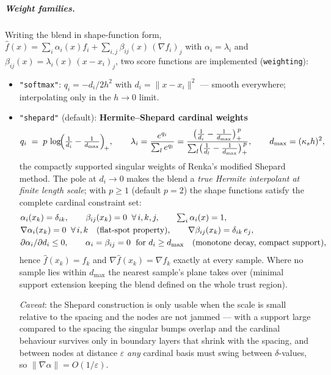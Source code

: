 \documentclass[11pt,a4paper]{article}
\newcommand{\code}[1]{\texttt{#1}}
\begin{document}
\subparagraph{Weight families.} Writing the blend in shape-function form,
$\hat f(x) = \sum_i \alpha_i(x) f_i + \sum_{i,j} \beta_{ij}(x)\, (\nabla f_i)_j$
with $\alpha_i = \lambda_i$ and $\beta_{ij}(x) = \lambda_i(x)\,(x-x_i)_j$,
two score functions are implemented (\code{weighting}):
\begin{itemize}
\item \code{"softmax"}: $q_i = -d_i/2h^2$ with $d_i = \lVert x-x_i\rVert^2$
--- smooth everywhere; interpolating only in the $h \to 0$ limit.
\item \code{"shepard"} (default): \textbf{Hermite--Shepard cardinal
weights}
\begin{equation}
q_i \;=\; p\,\log\!\Bigl(\tfrac{1}{d_i} - \tfrac{1}{d_{\max}}\Bigr)_{\!+},
\qquad
\lambda_i = \frac{e^{q_i}}{\sum_l e^{q_l}}
= \frac{\bigl(\tfrac{1}{d_i}-\tfrac{1}{d_{\max}}\bigr)_+^{\,p}}
{\sum_l \bigl(\tfrac{1}{d_l}-\tfrac{1}{d_{\max}}\bigr)_+^{\,p}},
\qquad d_{\max} = (\kappa_s h)^2,
\label{eq:shepard}
\end{equation}
the compactly supported singular weights of Renka's modified Shepard
method. The pole at $d_i \to 0$ makes the blend a \emph{true Hermite
interpolant at finite length scale}; with $p \ge 1$ (default $p=2$) the
shape functions satisfy the complete cardinal constraint set:
\begin{align}
&\alpha_i(x_k) = \delta_{ik}, \qquad
\beta_{ij}(x_k) = 0 \;\;\forall\, i,k,j, \qquad
\textstyle\sum_i \alpha_i(x) = 1, \notag\\
&\nabla\alpha_i(x_k) = 0 \;\;\forall\, i,k
\quad\text{(flat-spot property)}, \qquad
\nabla\beta_{ij}(x_k) = \delta_{ik}\, e_j, \notag\\
&\partial \alpha_i / \partial d_i \le 0, \qquad
\alpha_i = \beta_{ij} = 0 \;\text{ for } d_i \ge d_{\max}
\quad\text{(monotone decay, compact support)}, \notag
\end{align}
hence $\hat f(x_k) = f_k$ and $\nabla \hat f(x_k) = \nabla f_k$ exactly at
every sample. Where no sample lies within $d_{\max}$ the nearest sample's
plane takes over (minimal support extension keeping the blend defined on
the whole trust region).

\emph{Caveat}: the Shepard construction is only usable when the scale is
small relative to the spacing and the nodes are not jammed --- with a
support large compared to the spacing the singular bumps overlap and the
cardinal behaviour survives only in boundary layers that shrink with the
spacing, and between nodes at distance $\varepsilon$ \emph{any} cardinal
basis must swing between $\delta$-values, so
$\lVert\nabla\alpha\rVert = O(1/\varepsilon)$.


\end{itemize}
\end{document}
